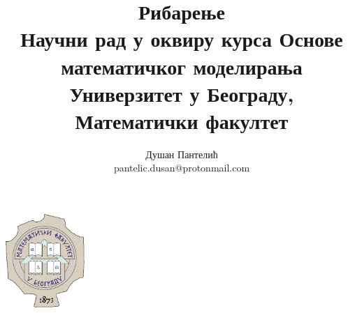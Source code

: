 \documentclass[a4paper]{article}
\begin{document}
\title{\Large Рибарење\\ \small{Научни рад у оквиру курса Основе математичког моделирања\\ Универзитет у Београду, Математички факултет}}

\author{Душан Пантелић\\ pantelic.dusan@protonmail.com}

\maketitle

\begin{center}
	\includegraphics[width=3cm]{images/pmf.png}
\end{center}
\end{document}
